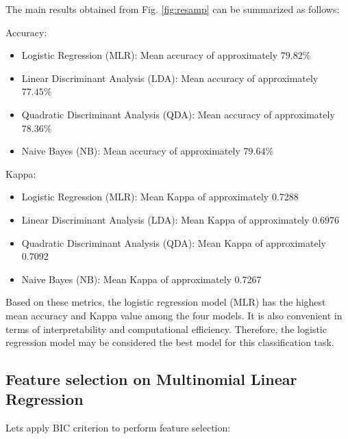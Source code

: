 \documentclass[11pt,]{article}
\providecommand{\tightlist}{%
\setlength{\itemsep}{0pt}\setlength{\parskip}{0pt}}
\begin{document}
The main results obtained from Fig. \ref{fig:resamp} can be summarized
as follows:

Accuracy:

\begin{itemize}
\tightlist
\item
  Logistic Regression (MLR): Mean accuracy of approximately \(79.82 \%\)
\item
  Linear Discriminant Analysis (LDA): Mean accuracy of approximately
  \(77.45 \%\)
\item
  Quadratic Discriminant Analysis (QDA): Mean accuracy of approximately
  \(78.36 \%\)
\item
  Naive Bayes (NB): Mean accuracy of approximately \(79.64 \%\)
\end{itemize}

Kappa:

\begin{itemize}
\tightlist
\item
  Logistic Regression (MLR): Mean Kappa of approximately 0.7288
\item
  Linear Discriminant Analysis (LDA): Mean Kappa of approximately 0.6976
\item
  Quadratic Discriminant Analysis (QDA): Mean Kappa of approximately
  0.7092
\item
  Naive Bayes (NB): Mean Kappa of approximately 0.7267
\end{itemize}

Based on these metrics, the logistic regression model (MLR) has the
highest mean accuracy and Kappa value among the four models. It is also
convenient in terms of interpretability and computational efficiency.
Therefore, the logistic regression model may be considered the best
model for this classification task.

\hypertarget{feature-selection-on-multinomial-linear-regression}{%
\subsection{Feature selection on Multinomial Linear
Regression}\label{feature-selection-on-multinomial-linear-regression}}

Lets apply BIC criterion to perform feature selection:
\end{document}
